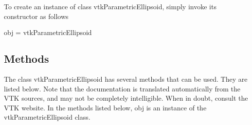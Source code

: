 To create an instance of class vtk\-Parametric\-Ellipsoid, simply invoke its constructor as follows \begin{DoxyVerb}  obj = vtkParametricEllipsoid
\end{DoxyVerb}
 \hypertarget{vtkwidgets_vtkxyplotwidget_Methods}{}\subsection{Methods}\label{vtkwidgets_vtkxyplotwidget_Methods}
The class vtk\-Parametric\-Ellipsoid has several methods that can be used. They are listed below. Note that the documentation is translated automatically from the V\-T\-K sources, and may not be completely intelligible. When in doubt, consult the V\-T\-K website. In the methods listed below, {\ttfamily obj} is an instance of the vtk\-Parametric\-Ellipsoid class. 
